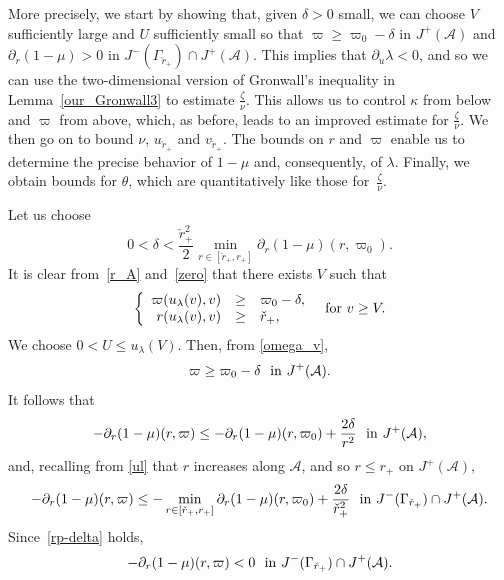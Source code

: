 \documentclass[a4paper,11pt,oneside,reqno]{amsart}
\newcommand{\cal}{\mathcal}
\newcommand{\ckrp}{\check r_+}
\begin{document}
More precisely, we start by showing that, given $\delta>0$ small, we can choose $V$ sufficiently large
and $U$ sufficiently small so that $\varpi\geq\varpi_0-\delta$ in
$J^+({\cal A})$ and $\partial_r(1-\mu)>0$ in $J^-(\Gamma_{\ckrp})\cap J^+({\cal A})$. This implies that $\partial_u\lambda<0$, and so we can use the two-dimensional version
of Gronwall's inequality in Lemma~\ref{our_Gronwall3} to estimate $\frac{\zeta}{\nu}$.
This allows us to control $\kappa$ from below and $\varpi$ from above,
which, as before, leads to an improved estimate for $\frac{\zeta}{\nu}$.
We then go on to bound $\nu$, $u_{\ckrp}$ and $v_{\ckrp}$.
The bounds on $r$ and $\varpi$ enable us to determine the precise
behavior of $1-\mu$ and, consequently, of $\lambda$. Finally,
we obtain bounds for $\theta$, which are quantitatively like those
for~$\frac{\zeta}{\nu}$.

Let us choose
\begin{equation}\label{rp-delta}
0<\delta<\frac{\ckrp^2}{2}\min_{r\in[\ckrp,r_+]}\partial_r(1-\mu)(r,\varpi_0).
\end{equation}
It is clear from~\eqref{r_A} and~\eqref{zero} that there exists $V$ such that
$$
\left\{
\begin{array}{rcl}
\varpi(u_\lambda(v),v)&\geq&\varpi_0-\delta,\\
r(u_\lambda(v),v)&\geq&\ckrp,
\end{array}
\right.\ \ {\rm for}\ v\geq V.
$$
We choose $0<U\leq u_\lambda(V)$. Then, from \eqref{omega_v},
$$
\varpi\geq\varpi_0-\delta \ \ {\rm in}\ J^+({\cal A}).
$$
It follows that
$$
-\partial_r(1-\mu)(r,\varpi)\leq -\partial_r(1-\mu)(r,\varpi_0)+
\frac{2\delta}{r^2} \ \ {\rm in}\ J^+({\cal A}),
$$ 
and, recalling from \eqref{ul} that $r$ increases along ${\cal A}$, and so $r \leq r_+$ on $J^+({\cal A})$, 
$$
-\partial_r(1-\mu)(r,\varpi)\leq -\min_{r\in[\ckrp,r_+]}\partial_r(1-\mu)(r,\varpi_0)+
\frac{2\delta}{\ckrp^2} \ \ {\rm in}\ J^-(\Gamma_{\ckrp})\cap J^+({\cal A}).
$$ 
Since~\eqref{rp-delta} holds, 
\begin{equation}
\label{dlmz_2}
-\partial_r(1-\mu)(r,\varpi)<0 \ \ {\rm in}\ J^-(\Gamma_{\ckrp})\cap J^+({\cal A}).
\end{equation}
\end{document}
